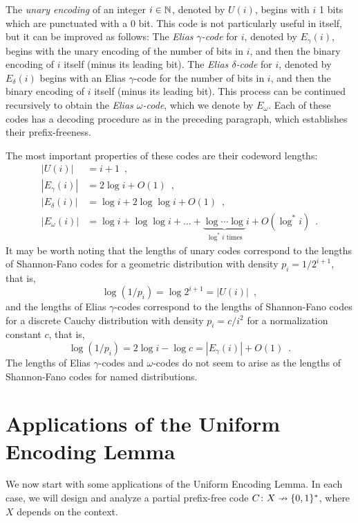 \documentclass[prodmode,acmcsur]{acmsmall}
\begin{document}
The \emph{unary encoding} of an integer $i \in \mathbb{N}$, denoted by $U(i)$,
begins with $i$ 1 bits which are punctuated with a 0 bit. This code is
not particularly useful in itself, but it can be improved as follows:
The \emph{Elias $\gamma$-code} for $i$, denoted by $E_\gamma(i)$,
begins with the unary encoding of the number of bits in $i$, and then
the binary encoding of $i$ itself (minus its leading bit). The
\emph{Elias $\delta$-code} for $i$, denoted by $E_\delta(i)$ begins
with an Elias $\gamma$-code for the number of bits in $i$, and then
the binary encoding of $i$ itself (minus its leading bit). This
process can be continued recursively to obtain the \emph{Elias
  $\omega$-code}, which we denote by $E_\omega$. Each of these codes
has a decoding procedure as in the preceding paragraph, which
establishes their prefix-freeness.

The most important properties of these codes are their codeword
lengths:
\begin{align*}
  |U(i)| &= i + 1 \enspace , \\
  |E_\gamma(i)| &= 2 \log i + O(1) \enspace , \\
  |E_\delta(i)| &= \log i + 2 \log \log i + O(1) \enspace , \\
  |E_\omega(i)| &= \log i + \log \log i + \dots + \underbrace{\log \cdots \log}_{\text{$\log^* i$ times}}i + O(\log^* i) \enspace .
\end{align*}
It may be worth noting that the lengths of unary codes correspond to
the lengths of Shannon-Fano codes for a geometric distribution with
density $p_i = 1/2^{i + 1}$, that is, 
\[
  \log (1/p_i) = \log 2^{i + 1} = |U(i)| \enspace ,
\]
and the lengths of Elias $\gamma$-codes correspond to the lengths of
Shannon-Fano codes for a discrete Cauchy distribution with density
$p_i = c/i^2$ for a normalization constant $c$, that is,
\[
  \log (1/p_i) = 2 \log i - \log c = |E_\gamma(i)| + O(1) \enspace .
\]
The lengths of Elias $\gamma$-codes and $\omega$-codes do not seem to
arise as the lengths of Shannon-Fano codes for named distributions.

\section{Applications of the Uniform Encoding Lemma}

We now start with some applications of the Uniform Encoding Lemma. In
each case, we will design and analyze a partial prefix-free code
$C\colon X\nrightarrow \{0, 1\}^*$, where $X$ depends on
the context.
\end{document}

